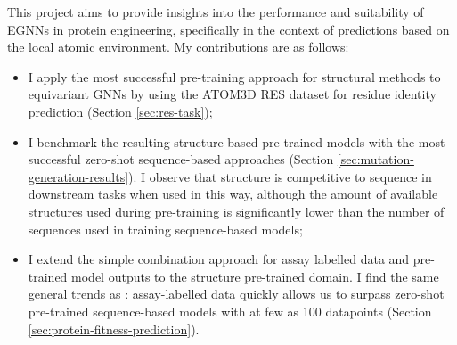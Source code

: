 This project aims to provide insights into the performance and suitability of EGNNs in protein engineering, specifically in the context of predictions based on the local atomic environment. My contributions are as follows:
\begin{itemize}
    \item I apply the most successful pre-training approach for structural methods \cite{mutcompute} to equivariant GNNs by using the ATOM3D RES dataset \cite{atom-3d} for residue identity prediction  (Section \ref{sec:res-task});
    \item I benchmark the resulting structure-based pre-trained models with the most successful zero-shot sequence-based approaches (Section \ref{sec:mutation-generation-results}). I observe that structure is competitive to sequence in downstream tasks when used in this way, although the amount of available structures used during pre-training is significantly lower than the number of sequences used in training sequence-based models;
    \item I extend the simple combination approach for assay labelled data and pre-trained model outputs \cite{chloe-hsu} to the structure pre-trained domain. I find the same general trends as \citet{chloe-hsu}: assay-labelled data quickly allows us to surpass zero-shot pre-trained sequence-based models with at few as 100 datapoints (Section \ref{sec:protein-fitness-prediction}).
\end{itemize}
